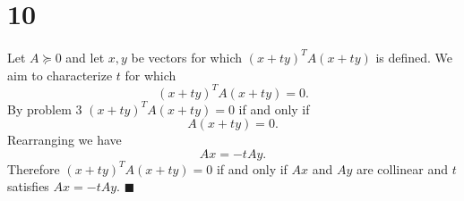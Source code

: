 \documentclass[letterpaper,12pt,oneside,onecolumn]{article}
\begin{document}
\section*{10}
\paragraph{}
Let $A \succcurlyeq 0$ and let $x,y$ be vectors for which $(x+ty)^TA(x+ty)$ is defined. We aim to characterize $t$ for which
\begin{equation}(x+ty)^TA(x+ty) = 0\label{eq:goal}.\end{equation} By problem $3$ $(x+ty)^TA(x+ty) = 0$ if and only if $$A(x+ty)=0.$$
Rearranging we have $$Ax = -tAy.$$
Therefore $(x+ty)^TA(x+ty) = 0$ if and only if $Ax$ and $Ay$ are collinear and $t$ satisfies $Ax = -tAy$. $\blacksquare$
\end{document}
